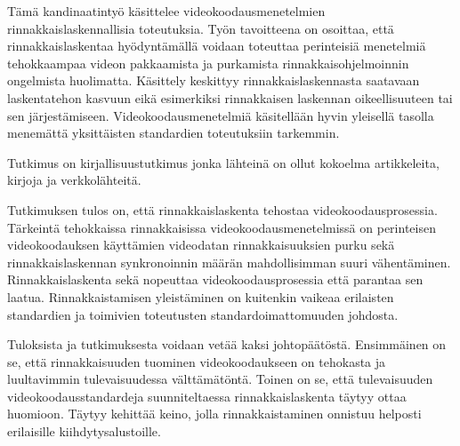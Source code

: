 \begin{fiabstract}

Tämä kandinaatintyö käsittelee videokoodausmenetelmien rinnakkaislaskennallisia
toteutuksia. Työn tavoitteena on osoittaa, että rinnakkaislaskentaa
hyödyntämällä voidaan toteuttaa perinteisiä menetelmiä tehokkaampaa videon
pakkaamista ja purkamista rinnakkaisohjelmoinnin ongelmista huolimatta.
Käsittely keskittyy rinnakkaislaskennasta saatavaan
laskentatehon kasvuun eikä esimerkiksi rinnakkaisen laskennan oikeellisuuteen
tai sen järjestämiseen. Videokoodausmenetelmiä käsitellään hyvin yleisellä
tasolla menemättä yksittäisten standardien toteutuksiin tarkemmin.

Tutkimus on kirjallisuustutkimus jonka lähteinä on ollut kokoelma artikkeleita,
kirjoja ja verkkolähteitä.

Tutkimuksen tulos on, että rinnakkaislaskenta tehostaa videokoodausprosessia.
Tärkeintä tehokkaissa rinnakkaisissa videokoodausmenetelmissä on perinteisen
videokoodauksen käyttämien videodatan rinnakkaisuuksien purku sekä
rinnakkaislaskennan synkronoinnin määrän mahdollisimman suuri vähentäminen.
Rinnakkaislaskenta sekä nopeuttaa videokoodausprosessia että parantaa sen
laatua. Rinnakkaistamisen yleistäminen on kuitenkin vaikeaa erilaisten
standardien ja toimivien toteutusten standardoimattomuuden johdosta.

Tuloksista ja tutkimuksesta voidaan vetää kaksi johtopäätöstä. Ensimmäinen on se, että
rinnakkaisuuden tuominen videokoodaukseen on tehokasta ja luultavimmin
tulevaisuudessa välttämätöntä. Toinen on se, että tulevaisuuden
videokoodausstandardeja suunniteltaessa rinnakkaislaskenta täytyy ottaa
huomioon. Täytyy kehittää keino, jolla rinnakkaistaminen onnistuu helposti
erilaisille kiihdytysalustoille.

%
\end{fiabstract}


